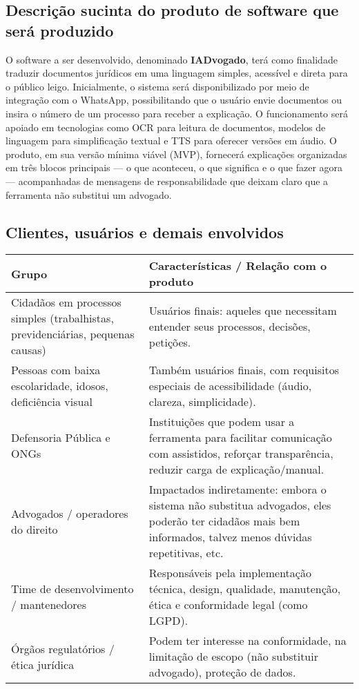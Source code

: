 \documentclass{article}
\begin{document}
\subsection{Descrição sucinta do produto de software que será produzido }
O software a ser desenvolvido, denominado \textbf{IADvogado}, terá como finalidade traduzir documentos jurídicos em uma linguagem simples, acessível e direta para o público leigo. Inicialmente, o sistema será disponibilizado por meio de integração com o WhatsApp, possibilitando que o usuário envie documentos ou insira o número de um processo para receber a explicação. O funcionamento será apoiado em tecnologias como OCR para leitura de documentos, modelos de linguagem para simplificação textual e TTS para oferecer versões em áudio. O produto, em sua versão mínima viável (MVP), fornecerá explicações organizadas em três blocos principais — o que aconteceu, o que significa e o que fazer agora — acompanhadas de mensagens de responsabilidade que deixam claro que a ferramenta não substitui um advogado. 

\subsection{Clientes, usuários e demais envolvidos }
\begin{tabular}{|p{6cm}|p{6cm}|}
    \hline
    \centering \textbf{Grupo} & \textbf{Características / Relação com o produto}\\ \hline
    Cidadãos em processos simples (trabalhistas, previdenciárias, pequenas causas) & Usuários finais: aqueles que necessitam entender seus processos, decisões, petições. \\\hline
    Pessoas com baixa escolaridade, idosos, deficiência visual &Também usuários finais, com requisitos especiais de acessibilidade (áudio, clareza, simplicidade).\\\hline
    Defensoria Pública e ONGs &Instituições que podem usar a ferramenta para facilitar comunicação com assistidos, reforçar transparência, reduzir carga de explicação/manual. \\\hline
    Advogados / operadores do direito &Impactados indiretamente: embora o sistema não substitua advogados, eles poderão ter cidadãos mais bem informados, talvez menos dúvidas repetitivas, etc. \\\hline
    Time de desenvolvimento / mantenedores &Responsáveis pela implementação técnica, design, qualidade, manutenção, ética e conformidade legal (como LGPD). \\\hline
    Órgãos regulatórios / ética jurídica &Podem ter interesse na conformidade, na limitação de escopo (não substituir advogado), proteção de dados. \\\hline
\end{tabular}
\end{document}
